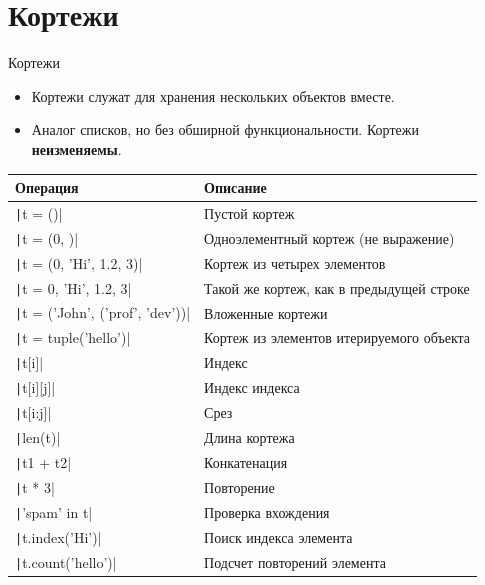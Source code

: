 \documentclass[aspectratio=169, mathserif]{beamer}%
\begin{document}
\section{Кортежи}
\sectionframe

\begin{frame}[fragile]{Кортежи}

\scriptsize
\begin{itemize}
\item Кортежи служат для хранения нескольких объектов вместе. 
\item Аналог списков, но без обширной функциональности. Кортежи \textcolor{extraorange}{\textbf{неизменяемы}}.
\end{itemize}

\begin{table}[h!]
\centering
\tiny
\begin{tabular}{|p{}|p{}|}
\hline
\textbf{Операция} & \textbf{Описание} \\ 
\hline 
\texttt|t = ()| & Пустой кортеж \\
\texttt|t = (0, )| & Одноэлементный кортеж (не выражение) \\
\texttt|t = (0, 'Hi', 1.2, 3)| & Кортеж из четырех элементов \\
\texttt|t = 0, 'Hi', 1.2, 3| & Такой же кортеж, как в предыдущей строке \\
\texttt|t = ('John', ('prof', 'dev'))| & Вложенные кортежи \\
\texttt|t = tuple('hello')| & Кортеж из элементов итерируемого объекта \\
\texttt|t[i]| & Индекс \\
\texttt|t[i][j]| & Индекс индекса \\
\texttt|t[i:j]| & Срез \\
\texttt|len(t)| & Длина кортежа \\
\texttt|t1 + t2| & Конкатенация \\
\texttt|t * 3| & Повторение \\
\texttt|'spam' in t| & Проверка вхождения\\
\texttt|t.index('Hi')| & Поиск индекса элемента \\
\texttt|t.count('hello')| & Подсчет повторений элемента \\
\hline

\end{tabular}

\end{table}
\vfill
\end{frame}
\end{document}
